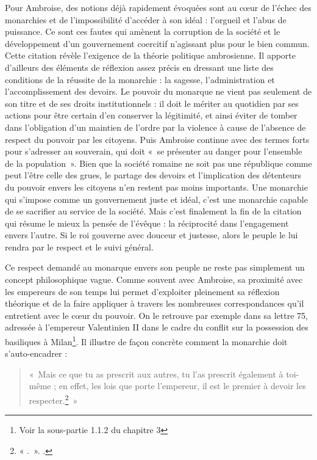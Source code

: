 \bigskip

Pour Ambroise, des notions déjà rapidement évoquées sont au cœur de l'échec des monarchies et de l'impossibilité d'accéder à son idéal : l'orgueil et l'abus de puissance. Ce sont ces fautes qui amènent la corruption de la société et le développement d'un gouvernement coercitif n'agissant plus pour le bien commun. Cette citation révèle l'exigence de la théorie politique ambrosienne. Il apporte d'ailleurs des éléments de réflexion assez précis en dressant une liste des conditions de la réussite de la monarchie : la sagesse, l'administration et l'accomplissement des devoirs. Le pouvoir du monarque ne vient pas seulement de son titre et de ses droits institutionnels : il doit le mériter au quotidien par ses actions pour être certain d'en conserver la légitimité, et ainsi éviter de tomber dans l'obligation d'un maintien de l'ordre par la violence à cause de l'absence de respect du pouvoir par les citoyens. Puis Ambroise continue avec des termes forts pour s'adresser au souverain, qui doit «~se présenter au danger pour l'ensemble de la population~». Bien que la société romaine ne soit pas une république comme peut l'être celle des grues, le partage des devoirs et l'implication des détenteurs du pouvoir envers les citoyens n'en restent pas moins importants. Une monarchie qui s'impose comme un gouvernement juste et idéal, c'est une monarchie capable de se sacrifier au service de la société. Mais c'est finalement la fin de la citation qui résume le mieux la pensée de l'évêque : la réciprocité dans l'engagement envers l'autre. Si le roi gouverne avec douceur et justesse, alors le peuple le lui rendra par le respect et le suivi général.

\bigskip

Ce respect demandé au monarque envers son peuple ne reste pas simplement un concept philosophique vague. Comme souvent avec Ambroise, sa proximité avec les empereurs de son temps lui permet d'exploiter pleinement sa réflexion théorique et de la faire appliquer à travers les nombreuses correspondances qu'il entretient avec le cœur du pouvoir. On le retrouve par exemple dans sa lettre 75, adressée à l'empereur Valentinien II dans le cadre du conflit sur la possession des basiliques à Milan\footnote{Voir la sous-partie 1.1.2 du chapitre 3}. Il illustre de façon concrète comment la monarchie doit s'auto-encadrer :

\bigskip

\begin{quote}
    «~Mais ce que tu as prescrit aux autres, tu l'as prescrit également à toi-même ; en effet, les lois que porte l'empereur, il est le premier à devoir les respecter.\footnote{« .~». \cite[, 9]{ambroise_csel_82_3}.}~»
\end{quote}

